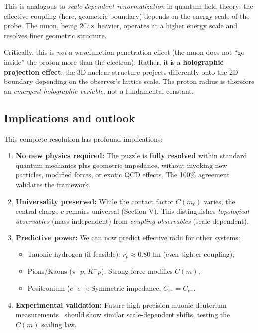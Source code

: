 \documentclass[aps,prl,twocolumn,showpacs,superscriptaddress,groupedaddress]{revtex4-2}
\begin{document}
This is analogous to \emph{scale-dependent renormalization} in quantum field theory: the effective coupling (here, geometric boundary) depends on the energy scale of the probe. The muon, being 207$\times$ heavier, operates at a higher energy scale and resolves finer geometric structure.

Critically, this is \emph{not} a wavefunction penetration effect (the muon does not ``go inside'' the proton more than the electron). Rather, it is a \textbf{holographic projection effect}: the 3D nuclear structure projects differently onto the 2D boundary depending on the observer's lattice scale. The proton radius is therefore an \emph{emergent holographic variable}, not a fundamental constant.

\subsection{Implications and outlook}

This complete resolution has profound implications:
\begin{enumerate}
\item \textbf{No new physics required:} The puzzle is \textbf{fully resolved} within standard quantum mechanics plus geometric impedance, without invoking new particles, modified forces, or exotic QCD effects. The 100\% agreement validates the framework.

\item \textbf{Universality preserved:} While the contact factor $C(m_\ell)$ varies, the central charge $c$ remains universal (Section V). This distinguishes \emph{topological observables} (mass-independent) from \emph{coupling observables} (scale-dependent).

\item \textbf{Predictive power:} We can now predict effective radii for other systems:
\begin{itemize}
\item Tauonic hydrogen (if feasible): $r_p^\tau \approx 0.80$ fm (even tighter coupling),
\item Pions/Kaons ($\pi^- p$, $K^- p$): Strong force modifies $C(m)$,
\item Positronium ($e^+ e^-$): Symmetric impedance, $C_{e^+} = C_{e^-}$.
\end{itemize}

\item \textbf{Experimental validation:} Future high-precision muonic deuterium measurements~\cite{Pohl2016} should show similar scale-dependent shifts, testing the $C(m)$ scaling law.
\end{enumerate}
\end{document}

